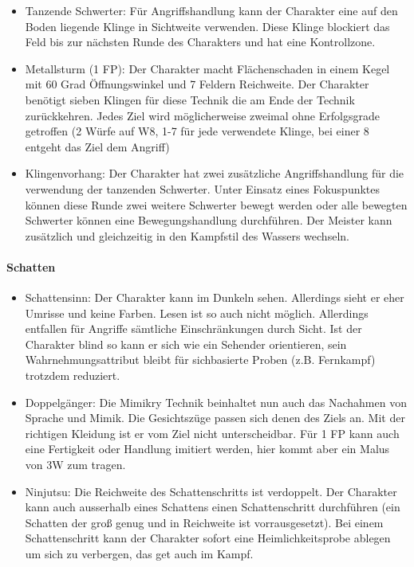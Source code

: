 \documentclass{article}
\begin{document}
\begin{itemize}
\item Tanzende Schwerter: Für Angriffshandlung kann der Charakter eine auf den Boden liegende Klinge in Sichtweite verwenden. Diese Klinge blockiert das Feld bis zur nächsten Runde des Charakters und hat eine Kontrollzone.
\item Metallsturm (1 FP): Der Charakter macht Flächenschaden in einem Kegel mit 60 Grad Öffnungswinkel und 7 Feldern Reichweite. Der Charakter benötigt sieben Klingen für diese Technik die am Ende der Technik zurückkehren. Jedes Ziel wird möglicherweise zweimal ohne Erfolgsgrade getroffen (2 Würfe auf W8, 1-7 für jede verwendete Klinge, bei einer 8 entgeht das Ziel dem Angriff)
\item Klingenvorhang: Der Charakter hat zwei zusätzliche Angriffshandlung für die verwendung der tanzenden Schwerter. Unter Einsatz eines Fokuspunktes können diese Runde zwei weitere Schwerter bewegt werden oder alle bewegten Schwerter können eine Bewegungshandlung durchführen. Der Meister kann zusätzlich und gleichzeitig in den Kampfstil des Wassers wechseln.
\end{itemize}

\paragraph{Schatten}

\begin{itemize}
\item Schattensinn: Der Charakter kann im Dunkeln sehen. Allerdings sieht er eher Umrisse und keine Farben. Lesen ist so auch nicht möglich. Allerdings entfallen für Angriffe sämtliche Einschränkungen durch Sicht. Ist der Charakter blind so kann er sich wie ein Sehender orientieren, sein Wahrnehmungsattribut bleibt für sichbasierte Proben (z.B. Fernkampf) trotzdem reduziert.
\item Doppelgänger: Die Mimikry Technik beinhaltet nun auch das Nachahmen von Sprache und Mimik. Die Gesichtszüge passen sich denen des Ziels an. Mit der richtigen Kleidung ist er vom Ziel nicht unterscheidbar. Für 1 FP kann auch eine Fertigkeit oder Handlung imitiert werden, hier kommt aber ein Malus von 3W zum tragen.
\item Ninjutsu: Die Reichweite des Schattenschritts ist verdoppelt. Der Charakter kann auch ausserhalb eines Schattens einen Schattenschritt durchführen (ein Schatten der groß genug und in Reichweite ist vorrausgesetzt). Bei einem Schattenschritt kann der Charakter sofort eine Heimlichkeitsprobe ablegen um sich zu verbergen, das get auch im Kampf.
\end{itemize}
\end{document}
